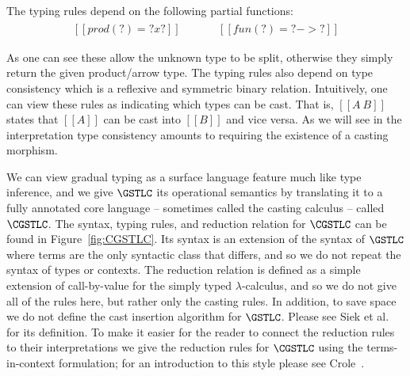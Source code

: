 The typing rules depend on the following partial functions:
\[
\begin{array}{lll}
  \begin{array}{lll}
  [[prod(?) = ? x ?]]\\
  [[prod(A1 x A2) = A1 x A2]]\\
  \end{array}
  & \quad &
  \begin{array}{lll}
  [[fun(?) = ? -> ?]]\\
  [[fun(A1 -> A2) = A1 -> A2]]\\
\end{array}
\end{array}
\]
As one can see these allow the unknown type to be split, otherwise
they simply return the given product/arrow type.  The typing rules
also depend on type consistency which is a reflexive and symmetric
binary relation.  Intuitively, one can view these rules as indicating
which types can be cast.  That is, $[[A ~ B]]$ states that $[[A]]$ can
be cast into $[[B]]$ and vice versa.  As we will see in the
interpretation type consistency amounts to requiring the existence of
a casting morphism.

We can view gradual typing as a surface language feature much like
type inference, and we give $\GSTLC$ its operational semantics by
translating it to a fully annotated core language -- sometimes called
the casting calculus -- called $\CGSTLC$. The syntax, typing rules,
and reduction relation for $\CGSTLC$ can be found in
Figure~\ref{fig:CGSTLC}. Its syntax is an extension of the syntax of
$\GSTLC$ where terms are the only syntactic class that differs, and so
we do not repeat the syntax of types or contexts. The reduction
relation is defined as a simple extension of call-by-value for the
simply typed $\lambda$-calculus, and so we do not give all of the
rules here, but rather only the casting rules.  In addition, to save
space we do not define the cast insertion algorithm for $\GSTLC$.
Please see Siek et al.~\cite{Siek:2015} for its definition.  To make
it easier for the reader to connect the reduction rules to their
interpretations we give the reduction rules for $\CGSTLC$ using the
terms-in-context formulation; for an introduction to this style please
see Crole~\cite{Crole:1994}.

